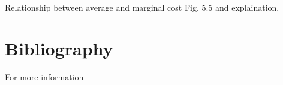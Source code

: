 \documentclass[12pt,ignorenonframetext,aspectratio=169]{beamer}
\begin{document}
\begin{frame}{Relationship between average and marginal cost}
\protect\hypertarget{relationship-between-average-and-marginal-cost}{}
Fig. 5.5 and explaination.
\end{frame}

\hypertarget{bibliography}{%
\section{Bibliography}\label{bibliography}}

\begin{frame}{For more information}
\protect\hypertarget{for-more-information}{}
\end{frame}
\end{document}
